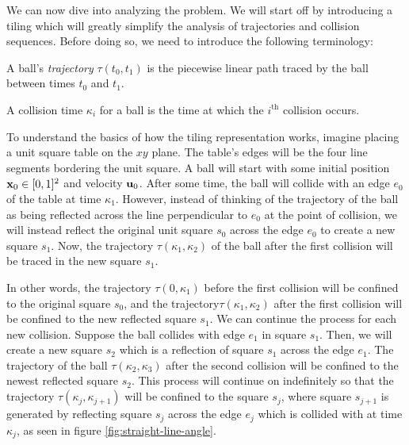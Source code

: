
We can now dive into analyzing the problem. We will start off by introducing a tiling which will greatly simplify the analysis of trajectories and collision sequences. Before doing so, we need to introduce the following terminology:

\begin{definition}
  A ball's \emph{trajectory} $\tau(t_0, t_1)$ is the piecewise linear path traced by the ball between times $t_0$ and $t_1$.
\end{definition}

\begin{definition}
  A collision time $\kappa_i$ for a ball is the time at which the $i^{\textrm{th}}$ collision occurs.
\end{definition}

To understand the basics of how the tiling representation works, imagine placing a unit square table on the $xy$ plane. The table's edges will be the four line segments bordering the unit square. A ball will start with some initial position $\mathbf{x}_0 \in [0,1]^2$ and velocity $\mathbf{u}_0$. After some time, the ball will collide with an edge $e_0$ of the table at time $\kappa_1$. However, instead of thinking of the trajectory of the ball as being reflected across the line perpendicular to $e_0$ at the point of collision, we will instead reflect the original unit square $s_0$ across the edge $e_0$ to create a new square $s_1$. Now, the trajectory $\tau(\kappa_1, \kappa_2)$ of the ball after the first collision will be traced in the new square $s_1$.

In other words, the trajectory $\tau(0, \kappa_1)$ before the first collision will be confined to the original square $s_0$, and the trajectory$\tau(\kappa_1, \kappa_2)$ after the first collision will be confined to the new reflected square $s_1$. We can continue the process for each new collision. Suppose the ball collides with edge $e_1$ in square $s_1$. Then, we will create a new square $s_2$ which is a reflection of square $s_1$ across the edge $e_1$. The trajectory of the ball $\tau(\kappa_2, \kappa_3)$ after the second collision will be confined to the newest reflected square $s_2$. This process will continue on indefinitely so that the trajectory $\tau(\kappa_j, \kappa_{j+1})$ will be confined to the square $s_j$, where square $s_{j+1}$ is generated by reflecting square $s_{j}$ across the edge $e_{j}$ which is collided with at time $\kappa_j$, as seen in figure \ref{fig:straight-line-angle}.

